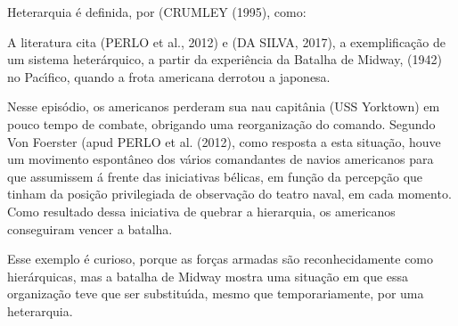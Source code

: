 \documentclass[
12pt,		%
openright,	%
twoside,  %
a4paper,			%
chapter=TITLE,		%
english,			%
french,				%
spanish,			%
brazil				%
]{USPSC-classe/USPSC}
\begin{document}
\noindent\begin{center}\mbox{\centering{}}\end{center}


Heterarquia \'e definida, por (CRUMLEY (1995), como:










\noindent\begin{center}\mbox{\centering{}}\end{center}


A literatura cita (PERLO et al., 2012) e (DA SILVA, 2017), a exemplifica\c{c}\~ao de um sistema heter\'arquico, a partir da experi\^encia da Batalha de Midway, (1942) no Pac\'{\i}fico, quando a frota americana derrotou a japonesa.









Nesse epis\'odio, os americanos perderam sua nau capit\^ania (USS Yorktown) em pouco tempo de combate, obrigando uma reorganiza\c{c}\~ao do comando. Segundo Von Foerster (apud PERLO et al. (2012), como resposta a esta situa\c{c}\~ao, houve um movimento espont\^aneo dos v\'arios comandantes de navios americanos para que assumissem \'a frente das iniciativas b\'elicas, em fun\c{c}\~ao da percep\c{c}\~ao que tinham da posi\c{c}\~ao privilegiada de observa\c{c}\~ao do teatro naval, em cada momento. Como resultado dessa iniciativa de \textquotedbl quebrar a hierarquia\textquotedbl , os americanos conseguiram vencer a batalha.









Esse exemplo \'e curioso, porque as for\c{c}as armadas s\~ao reconhecidamente como hier\'arquicas, mas a batalha de Midway mostra uma situa\c{c}\~ao em que essa organiza\c{c}\~ao teve que ser substitu\'{\i}da, mesmo que temporariamente, por uma heterarquia.
\end{document}
